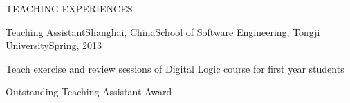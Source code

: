 \documentclass{resume} %
\begin{document}

\begin{rSection}{TEACHING EXPERIENCES}

  \begin{rSubsection}{Teaching Assistant}{Shanghai, China}{School of Software Engineering, Tongji University}{Spring, 2013}
  \item Teach exercise and review sessions of Digital Logic course for first year students
    \item Outstanding Teaching Assistant Award
  \end{rSubsection}

\end{rSection}

\end{document}
